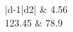 \documentclass{article}
\begin{document}
\begin{tabular}{|d{-1}|d{2}|}
 & 4.56 \\
123.45 & 78.9 \\
\hline
\end{tabular}
\end{document}
